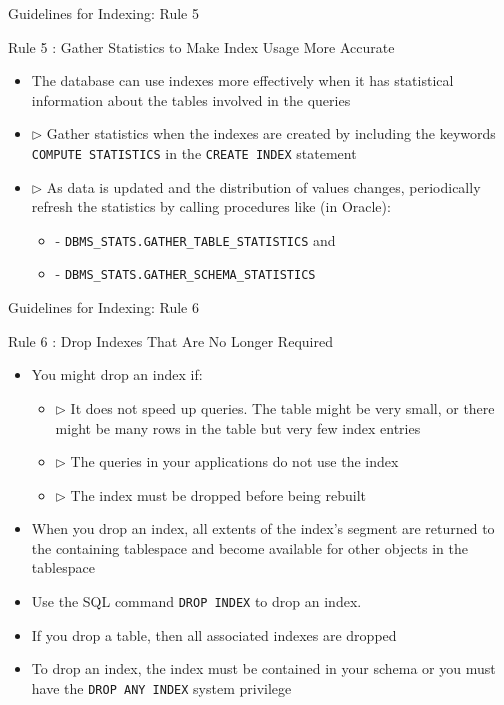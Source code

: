 \documentclass[aspectratio=169, xcolor=dvipsnames]{beamer}
\begin{document}
\begin{frame}{Guidelines for Indexing: Rule 5}
    \begin{alertblock}{Rule 5 : Gather Statistics to Make Index Usage More Accurate}
        \begin{itemize}[<+->]
            \item The database can use indexes more effectively when it has statistical information about the tables involved in the queries
            \item $\triangleright$ Gather statistics when the indexes are created by including the keywords \texttt{COMPUTE STATISTICS} in the \texttt{CREATE INDEX} statement
            \item $\triangleright$ As data is updated and the distribution of values changes, periodically refresh the statistics by calling procedures like (in Oracle):
            \begin{itemize}
                \item - \texttt{DBMS\_STATS.GATHER\_TABLE\_STATISTICS} and
                \item - \texttt{DBMS\_STATS.GATHER\_SCHEMA\_STATISTICS}
            \end{itemize}
        \end{itemize}
    \end{alertblock}
\end{frame}

\begin{frame}{Guidelines for Indexing: Rule 6}
    \begin{alertblock}{Rule 6 : Drop Indexes That Are No Longer Required}
        \begin{itemize}[<+->]
            \item You might drop an index if:
            \begin{itemize}
                \item $\triangleright$ It does not speed up queries. The table might be very small, or there might be many rows in the table but very few index entries
                \item $\triangleright$ The queries in your applications do not use the index
                \item $\triangleright$ The index must be dropped before being rebuilt
            \end{itemize}
            \item When you drop an index, all extents of the index's segment are returned to the containing tablespace and become available for other objects in the tablespace
            \item Use the SQL command \texttt{DROP INDEX} to drop an index.
            \item If you drop a table, then all associated indexes are dropped
            \item To drop an index, the index must be contained in your schema or you must have the \texttt{DROP ANY INDEX} system privilege
        \end{itemize}
    \end{alertblock}
\end{frame}
\end{document}
